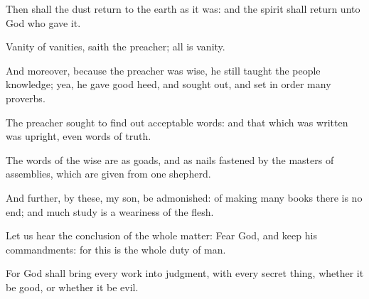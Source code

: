 \verse Then shall the dust return to the earth as it was: and the spirit shall return unto God who gave it.

\verse Vanity of vanities, saith the preacher; all is vanity.

\verse And moreover, because the preacher was wise, he still taught the people knowledge; yea, he gave good heed, and sought out, and set in order many proverbs.

\verse The preacher sought to find out acceptable words: and that which was written was upright, even words of truth.

\verse The words of the wise are as goads, and as nails fastened by the masters of assemblies, which are given from one shepherd.

\verse And further, by these, my son, be admonished: of making many books there is no end; and much study is a weariness of the flesh.

\verse Let us hear the conclusion of the whole matter: Fear God, and keep his commandments: for this is the whole duty of man.

\verse For God shall bring every work into judgment, with every secret thing, whether it be good, or whether it be evil.

